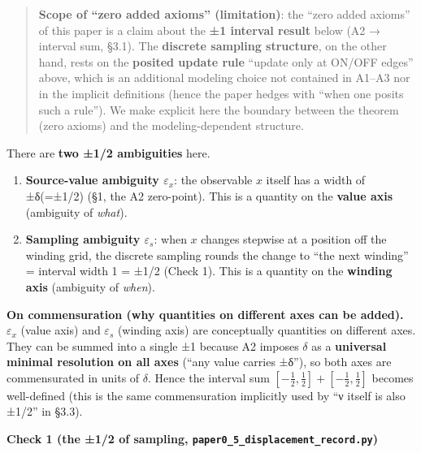 \documentclass[
]{ltjsarticle}
\providecommand{\tightlist}{%
  \setlength{\itemsep}{0pt}\setlength{\parskip}{0pt}}
\begin{document}
\begin{quote}
\textbf{Scope of ``zero added axioms'' (limitation)}: the ``zero added
axioms'' of this paper is a claim about the \textbf{±1 interval result}
below (A2 → interval sum, §3.1). The \textbf{discrete sampling
structure}, on the other hand, rests on the \textbf{posited update rule}
``update only at ON/OFF edges'' above, which is an additional modeling
choice not contained in A1--A3 nor in the implicit definitions (hence
the paper hedges with ``when one posits such a rule''). We make explicit
here the boundary between the theorem (zero axioms) and the
modeling-dependent structure.
\end{quote}

There are \textbf{two ±1/2 ambiguities} here.

\begin{enumerate}
\def\labelenumi{\arabic{enumi}.}
\tightlist
\item
  \textbf{Source-value ambiguity \(\varepsilon_x\)}: the observable
  \(x\) itself has a width of ±δ(=±1/2) (§1, the A2 zero-point). This is
  a quantity on the \textbf{value axis} (ambiguity of \emph{what}).
\item
  \textbf{Sampling ambiguity \(\varepsilon_s\)}: when \(x\) changes
  stepwise at a position off the winding grid, the discrete sampling
  rounds the change to ``the next winding'' = interval width 1 = ±1/2
  (Check 1). This is a quantity on the \textbf{winding axis} (ambiguity
  of \emph{when}).
\end{enumerate}

\textbf{On commensuration (why quantities on different axes can be
added).} \(\varepsilon_x\) (value axis) and \(\varepsilon_s\) (winding
axis) are conceptually quantities on different axes. They can be summed
into a single ±1 because A2 imposes \(\delta\) as a \textbf{universal
minimal resolution on all axes} (``any value carries ±δ''), so both axes
are commensurated in units of \(\delta\). Hence the interval sum
\([-\tfrac12,\tfrac12]+[-\tfrac12,\tfrac12]\) becomes well-defined (this
is the same commensuration implicitly used by ``ν itself is also ±1/2''
in §3.3).

\textbf{Check 1 (the ±1/2 of sampling,
\texttt{paper0\_5\_displacement\_record.py})}
\end{document}
